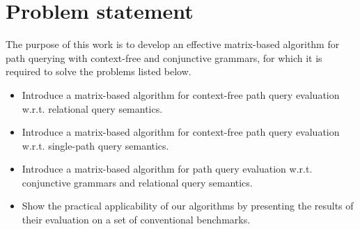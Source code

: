 \section{Problem statement}
The purpose of this work is to develop an effective matrix-based algorithm for path querying with context-free and conjunctive grammars, for which it is required to solve the problems listed below.
\begin{itemize}
	\item Introduce a matrix-based algorithm for context-free path query evaluation w.r.t. relational query semantics.
	\item Introduce a matrix-based algorithm for context-free path query evaluation w.r.t. single-path query semantics.
	\item Introduce a matrix-based algorithm for path query evaluation w.r.t.
	conjunctive grammars and relational query semantics.
	\item Show the practical applicability of our algorithms by presenting the results of their evaluation on a set of conventional benchmarks.
\end{itemize}
